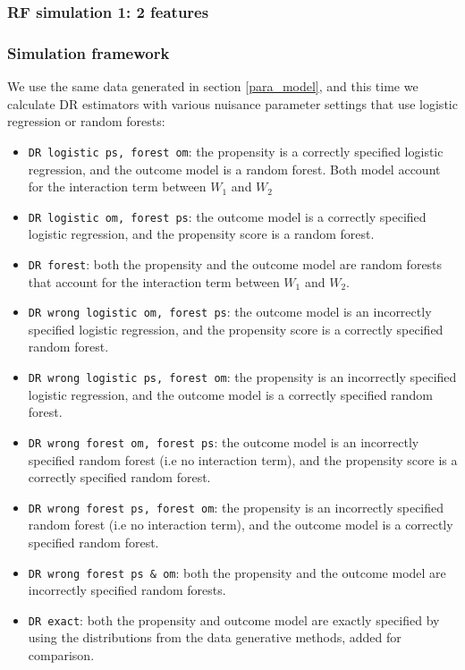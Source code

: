 \documentclass[12pt,twoside]{article}
\begin{document}

\subsubsection{RF simulation 1: 2 features}

\subsubsection*{Simulation framework}

We use the same data generated in section \ref{para_model}, and this time we calculate DR estimators with various nuisance parameter settings that use logistic regression or random forests:
\begin{itemize}
    \item \texttt{DR logistic ps, forest om}: the propensity is a correctly specified logistic regression, and the outcome model is a random forest. Both model account for the interaction term between $W_1$ and $W_2$
    \item \texttt{DR logistic om, forest ps}: the outcome model is a correctly specified logistic regression, and the propensity score is a random forest.
    \item \texttt{DR forest}: both the propensity and the outcome model are random forests that account for the interaction term between $W_1$ and $W_2$.
    \item \texttt{DR wrong logistic om, forest ps}: the outcome model is an incorrectly specified logistic regression, and the propensity score is a correctly specified random forest.
    \item \texttt{DR wrong logistic ps, forest om}: the propensity is an incorrectly specified logistic regression, and the outcome model is a correctly specified random forest.
    \item \texttt{DR wrong forest om, forest ps}: the outcome model is an incorrectly specified random forest (i.e no interaction term), and the propensity score is a correctly specified random forest.
    \item \texttt{DR wrong forest ps, forest om}: the propensity is an incorrectly specified random forest (i.e no interaction term), and the outcome model is a correctly specified random forest.
    \item \texttt{DR wrong forest ps \& om}: both the propensity and the outcome model are incorrectly specified random forests.
    \item \texttt{DR exact}: both the propensity and outcome model are exactly specified by using the distributions from the data generative methods, added for comparison.
\end{itemize}
\end{document}
